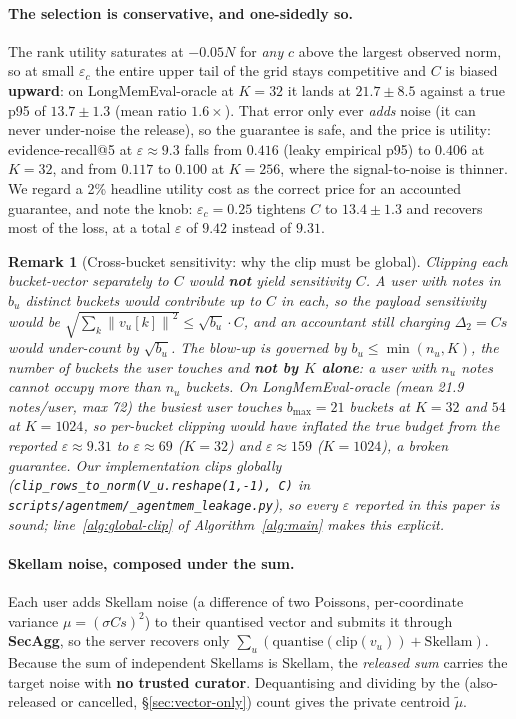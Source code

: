 \documentclass[pdflatex,sn-mathphys-num,12pt]{sn-jnl}
\theoremstyle{thmstyleone}%
\theoremstyle{thmstyletwo}%
\newtheorem{remark}{Remark}%
\theoremstyle{thmstylethree}%
\newcommand{\eps}{\varepsilon}
\newcommand{\norm}[1]{\left\lVert #1 \right\rVert}
\newcommand{\secref}[1]{\S\ref{#1}}
\begin{document}
\paragraph{The selection is conservative, and one-sidedly so.} The rank utility
saturates at $-0.05 N$ for \emph{any} $c$ above the largest observed norm, so at
small $\eps_c$ the entire upper tail of the grid stays competitive and $C$ is
biased \textbf{upward}: on LongMemEval-oracle at $K = 32$ it lands at
$21.7 \pm 8.5$ against a true p95 of $13.7 \pm 1.3$ (mean ratio $1.6\times$). That
error only ever \emph{adds} noise (it can never under-noise the release), so the
guarantee is safe, and the price is utility: evidence-recall@5 at $\eps \approx 9.3$
falls from $0.416$ (leaky empirical p95) to $\mathbf{0.406}$ at $K = 32$, and from
$0.117$ to $0.100$ at $K = 256$, where the signal-to-noise is thinner. We regard a
2\% headline utility cost as the correct price for an accounted guarantee, and note
the knob: $\eps_c = 0.25$ tightens $C$ to $13.4 \pm 1.3$ and recovers most of the
loss, at a total $\eps$ of $9.42$ instead of $9.31$.

\begin{remark}[Cross-bucket sensitivity: why the clip must be global]
\label{rem:global-clip}
Clipping each bucket-vector \emph{separately} to $C$ would \textbf{not} yield
sensitivity $C$. A user with notes in $b_u$ distinct buckets would contribute up
to $C$ in each, so the payload sensitivity would be
$\sqrt{\sum_k \norm{v_u[k]}^2} \leq \sqrt{b_u} \cdot C$, and an accountant still
charging $\Delta_2 = C s$ would under-count by $\sqrt{b_u}$. The blow-up is
governed by $b_u \leq \min(n_u, K)$, the number of buckets the user \emph{touches}
and \textbf{not by $K$ alone}: a user with $n_u$ notes cannot occupy more than
$n_u$ buckets. On LongMemEval-oracle (mean 21.9 notes/user, max 72) the busiest
user touches $b_{\max} = 21$ buckets at $K = 32$ and $54$ at $K = 1024$, so
per-bucket clipping would have inflated the true budget from the reported
$\eps \approx 9.31$ to $\eps \approx 69$ ($K = 32$) and $\eps \approx 159$
($K = 1024$), a broken guarantee. Our implementation clips globally
(\texttt{clip\_rows\_to\_norm(V\_u.reshape(1,-1), C)} in
\texttt{scripts/agentmem/\_agentmem\_leakage.py}), so every $\eps$ reported in this
paper is sound; line~\ref{alg:global-clip} of Algorithm~\ref{alg:main} makes this
explicit.
\end{remark}

\paragraph{Skellam noise, composed under the sum.} Each user adds Skellam noise
(a difference of two Poissons, per-coordinate variance $\mu = (\sigma C s)^2$) to
their quantised vector and submits it through \textbf{SecAgg}, so the server
recovers only $\sum_u (\mathrm{quantise}(\mathrm{clip}(v_u)) + \mathrm{Skellam})$.
Because the sum of independent Skellams is Skellam, the \emph{released sum} carries
the target noise with \textbf{no trusted curator}. Dequantising and dividing by the
(also-released or cancelled, \secref{sec:vector-only}) count gives the private
centroid $\tilde\mu$.
\end{document}
